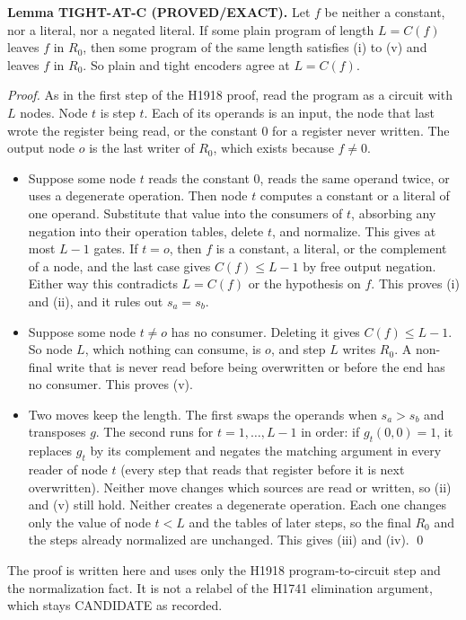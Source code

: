 \documentclass[11pt]{article}
\begin{document}
\textbf{Lemma TIGHT-AT-C (PROVED/EXACT).} Let $f$ be neither a constant, nor a literal, nor a negated literal. If some plain program of length $L=C(f)$ leaves $f$ in $R_0$, then some program of the same length satisfies (i) to (v) and leaves $f$ in $R_0$. So plain and tight encoders agree at $L=C(f)$.

\emph{Proof.} As in the first step of the H1918 proof, read the program as a circuit with $L$ nodes. Node $t$ is step $t$. Each of its operands is an input, the node that last wrote the register being read, or the constant $0$ for a register never written. The output node $o$ is the last writer of $R_0$, which exists because $f\ne 0$.
\begin{itemize}
\item[(a)] Suppose some node $t$ reads the constant $0$, reads the same operand twice, or uses a degenerate operation. Then node $t$ computes a constant or a literal of one operand. Substitute that value into the consumers of $t$, absorbing any negation into their operation tables, delete $t$, and normalize. This gives at most $L-1$ gates. If $t=o$, then $f$ is a constant, a literal, or the complement of a node, and the last case gives $C(f)\le L-1$ by free output negation. Either way this contradicts $L=C(f)$ or the hypothesis on $f$. This proves (i) and (ii), and it rules out $s_a=s_b$.
\item[(b)] Suppose some node $t\ne o$ has no consumer. Deleting it gives $C(f)\le L-1$. So node $L$, which nothing can consume, is $o$, and step $L$ writes $R_0$. A non-final write that is never read before being overwritten or before the end has no consumer. This proves (v).
\item[(c)] Two moves keep the length. The first swaps the operands when $s_a>s_b$ and transposes $g$. The second runs for $t=1,\dots,L-1$ in order: if $g_t(0,0)=1$, it replaces $g_t$ by its complement and negates the matching argument in every reader of node $t$ (every step that reads that register before it is next overwritten). Neither move changes which sources are read or written, so (ii) and (v) still hold. Neither creates a degenerate operation. Each one changes only the value of node $t<L$ and the tables of later steps, so the final $R_0$ and the steps already normalized are unchanged. This gives (iii) and (iv). \qed
\end{itemize}
The proof is written here and uses only the H1918 program-to-circuit step and the normalization fact. It is not a relabel of the H1741 elimination argument, which stays CANDIDATE as recorded.
\end{document}

